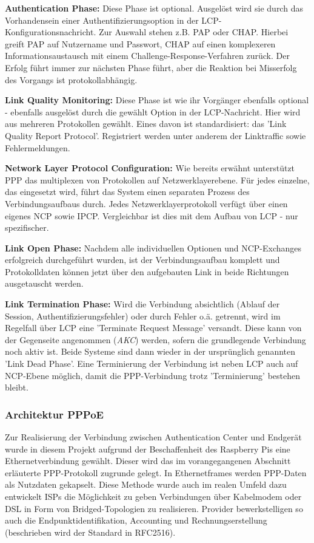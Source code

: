 \textbf{Authentication Phase:}
Diese Phase ist optional. Ausgelöst wird sie durch das Vorhandensein einer
Authentifizierungsoption in der LCP-Konfigurationsnachricht.
Zur Auswahl stehen z.B. \ac{PAP} oder \ac{CHAP}.
Hierbei greift PAP auf Nutzername und Passwort, CHAP auf einen komplexeren Informationsaustausch
mit einem Challenge-Response-Verfahren zurück. Der Erfolg führt immer zur nächsten
Phase führt, aber die Reaktion bei Misserfolg des Vorgangs ist protokollabhängig.

\textbf{Link Quality Monitoring:}
Diese Phase ist wie ihr Vorgänger ebenfalls optional - ebenfalls ausgelöst durch
die gewählt Option in der LCP-Nachricht.
Hier wird aus mehreren Protokollen gewählt. Eines davon ist standardisiert:
das 'Link Quality Report Protocol'. Registriert werden unter anderem der Linktraffic
sowie Fehlermeldungen.

\textbf{Network Layer Protocol Configuration:}
Wie bereits erwähnt unterstützt PPP  das multiplexen von Protokollen auf
Netzwerklayerebene. Für jedes einzelne, das eingesetzt wird,
führt das System einen separaten Prozess des Verbindungsaufbaus durch.
Jedes Netzwerklayerprotokoll verfügt über einen eigenes \ac{NCP} sowie \ac{IPCP}.
Vergleichbar ist dies mit dem Aufbau von \ac{LCP} - nur spezifischer.

\textbf{Link Open Phase:}
Nachdem alle individuellen Optionen und NCP-Exchanges erfolgreich durchgeführt wurden,
ist der Verbindungsaufbau komplett und Protokolldaten können jetzt über den aufgebauten
Link in beide Richtungen ausgetauscht werden.

\textbf{Link Termination Phase:}
Wird die Verbindung absichtlich (Ablauf der Session, Authentifizierungsfehler)
oder durch Fehler o.ä. getrennt, wird im Regelfall über \ac{LCP}
eine 'Terminate Request Message' versandt. Diese kann von der Gegenseite
angenommen (\textit{AKC}) werden, sofern die grundlegende Verbindung noch aktiv ist.
Beide Systeme sind dann wieder in der ursprünglich genannten 'Link Dead Phase'.
Eine Terminierung der Verbindung ist neben \ac{LCP} auch auf \ac{NCP}-Ebene möglich,
damit die PPP-Verbindung trotz 'Terminierung' bestehen bleibt.


\subsubsection{Architektur PPPoE}\label{subsubsection:architecture_pppoe}
Zur Realisierung der Verbindung zwischen Authentication Center und
Endgerät wurde in diesem Projekt aufgrund der Beschaffenheit des Raspberry Pis eine
Ethernetverbindung gewählt. Dieser wird das im vorangegangenen
Abschnitt erläuterte \ac{PPP}-Protokoll zugrunde gelegt.
In Ethernetframes werden PPP-Daten als Nutzdaten gekapselt.
Diese Methode wurde auch im realen Umfeld dazu entwickelt \acp{ISP} die
Möglichkeit zu geben Verbindungen über Kabelmodem oder DSL in Form
von Bridged-Topologien zu realisieren. Provider bewerkstelligen
so auch die Endpunktidentifikation, Accounting und Rechnungserstellung
(beschrieben wird der Standard in RFC2516).

